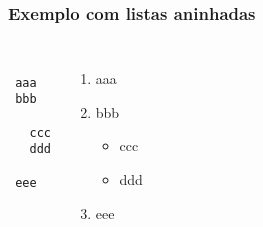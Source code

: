 \begin{frame}
  \frametitle{Exemplo com listas aninhadas}

  \begin{exemplo}

    \begin{columns}[c]
      \column{4cm}
      \texttt{\\
          \purple{\string\item}\ aaa\\
          \purple{\string\item}\ bbb\\
          \ \ \\
            \ \ \purple{\string\item}\ ccc\\
            \ \ \purple{\string\item}\ ddd\\
            \ \ \\
          \purple{\string\item}\ eee\\
          }
      \column{3cm}
      \begin{enumerate}
      \item aaa
      \item bbb
        \begin{itemize}
        \item ccc
        \item ddd
        \end{itemize}
      \item eee
      \end{enumerate}
    \end{columns}

  \end{exemplo}

\end{frame}

